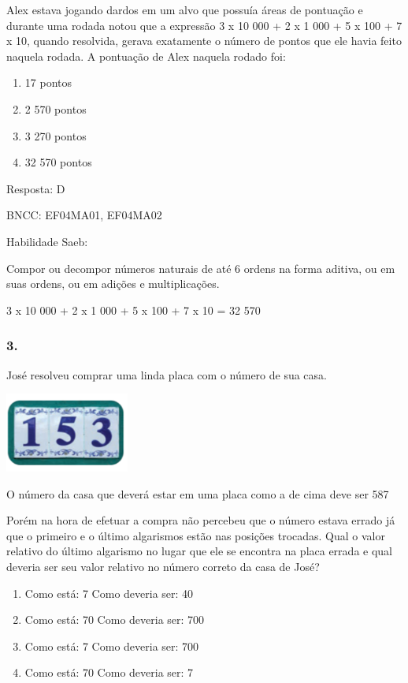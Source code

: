 Alex estava jogando dardos em um alvo que possuía áreas de pontuação e
durante uma rodada notou que a expressão 3 x 10 000 + 2 x 1 000 + 5 x
100 + 7 x 10, quando resolvida, gerava exatamente o número de pontos que
ele havia feito naquela rodada. A pontuação de Alex naquela rodado foi:

\begin{enumerate}
\def\labelenumi{\alph{enumi})}
\item
  17 pontos
\item
  2 570 pontos
\item
  3 270 pontos
\item
  32 570 pontos
\end{enumerate}

Resposta: D

BNCC: EF04MA01, EF04MA02

Habilidade Saeb:

Compor ou decompor números naturais de até 6 ordens na forma aditiva, ou
em suas ordens, ou em adições e multiplicações.

3 x 10 000 + 2 x 1 000 + 5 x 100 + 7 x 10 = 32 570

\subsubsection{3.}\label{section-145}

José resolveu comprar uma linda placa com o número de sua casa.

\includegraphics[width=1.60256in,height=1.03072in]{media/image143.png}

O número da casa que deverá estar em uma placa como a de cima deve ser
587

Porém na hora de efetuar a compra não percebeu que o número estava
errado já que o primeiro e o último algarismos estão nas posições
trocadas. Qual o valor relativo do último algarismo no lugar que ele se
encontra na placa errada e qual deveria ser seu valor relativo no número
correto da casa de José?

\begin{enumerate}
\def\labelenumi{\alph{enumi})}
\item
  Como está: 7 Como deveria ser: 40
\item
  Como está: 70 Como deveria ser: 700
\item
  Como está: 7 Como deveria ser: 700
\item
  Como está: 70 Como deveria ser: 7
\end{enumerate}

